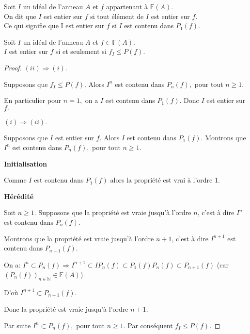 \begin{madefinition}
	Soit $I$ un idéal de l'anneau $A$ et $f $ appartenant à $ \mathbb{F}(A)$. \\
	On dit que $I$ est entier sur $f$ si tout élément de $I$ est entier sur $f$. \\
	Ce qui signifie que I est entier sur $f$ si $I $ est contenu dans $ P_1(f)$.
\end{madefinition}
\begin{maconsequence}
	Soit $I$ un idéal de l'anneau $A$ et $f \in \mathbb{F}(A)$. \\
	$I$ est entier sur $f$ si et seulement si $f_I \leqslant P(f)$.
\end{maconsequence}
\begin{proof}
	$(ii)\Longrightarrow (i)$.
	
	Supposons que $f_{I}\leq P(f).$ Alors $I^{n}$ est contenu dans $ P_{n}(f),$ pour tout $n\geq 1.$
	
	En particulier pour $n=1,$ on a $I$ est contenu dans $ P_{1}(f).$ Donc $I$ est entier sur $f.$
	
	$(i)\Longrightarrow (ii)$.
	
	Supposons que $I$ est entier sur $f.$ Alors $I$ est contenu dans $ P_{1}(f).$ Montrons que $I^{n}$ est contenu dans $ P_{n}(f),$ pour tout $n\geq 1.$
	
	\textbf{Initialisation}
	
	Comme $I$ est contenu dans $ P_{1}(f)$ alors la propriété est vrai à l'ordre 1.
	
	\textbf{Hérédité}
	
	Soit $n\geq 1.$ Supposons que la propriété est vraie jusqu'à l'ordre $n$, c'est à dire $I^{n}$ est contenu dans $ P_{n}(f).$
	
	Montrons que la propriété est vraie jusqu'à l'ordre $n+1$, c'est à dire $I^{n+1}$ est contenu dans $ P_{n+1}(f).$
	
	On a: $I^{n}\subset P_{n}(f)\Longrightarrow I^{n+1}\subset
	IP_{n}(f)\subset P_{1}(f)P_{n}(f)\subset P_{n+1}(f)$ (car $
	(P_{n}(f))_{n\in \mathbb{N}}\in \mathbb{F}(A)$).
	
	D'où $I^{n+1}\subset P_{n+1}(f).$
	
	Donc la propriété est vraie jusqu'à l'ordre $n+1.$
	
	Par suite $I^{n}\subset P_{n}(f),$ pour tout $n\geq 1.$ Par conséquent $f_{I}\leq P(f)$.
\end{proof}

